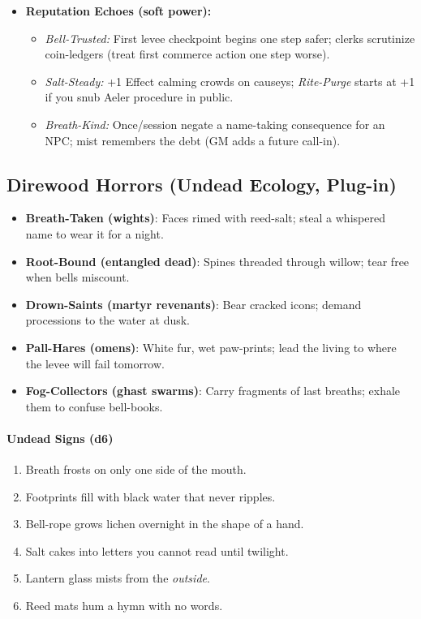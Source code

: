 \begin{itemize}
  \item \textbf{Reputation Echoes (soft power):}
  \begin{itemize}
    \item \emph{Bell-Trusted:} First levee checkpoint begins one step safer; clerks scrutinize coin-ledgers (treat first commerce action one step worse).
    \item \emph{Salt-Steady:} +1 Effect calming crowds on causeys; \emph{Rite-Purge} starts at +1 if you snub Aeler procedure in public.
    \item \emph{Breath-Kind:} Once/session negate a name-taking consequence for an NPC; mist remembers the debt (GM adds a future call-in).
  \end{itemize}
\end{itemize}


\subsection*{Direwood Horrors (Undead Ecology, Plug-in)}
\begin{itemize}
  \item \textbf{Breath-Taken (wights)}: Faces rimed with reed-salt; steal a whispered name to wear it for a night.
  \item \textbf{Root-Bound (entangled dead)}: Spines threaded through willow; tear free when bells miscount.
  \item \textbf{Drown-Saints (martyr revenants)}: Bear cracked icons; demand processions to the water at dusk.
  \item \textbf{Pall-Hares (omens)}: White fur, wet paw-prints; lead the living to where the levee will fail tomorrow.
  \item \textbf{Fog-Collectors (ghast swarms)}: Carry fragments of last breaths; exhale them to confuse bell-books.
\end{itemize}

\paragraph{Undead Signs (d6)}
\begin{enumerate}
  \item Breath frosts on only one side of the mouth.
  \item Footprints fill with black water that never ripples.
  \item Bell-rope grows lichen overnight in the shape of a hand.
  \item Salt cakes into letters you cannot read until twilight.
  \item Lantern glass mists from the \emph{outside}.
  \item Reed mats hum a hymn with no words.
\end{enumerate}

